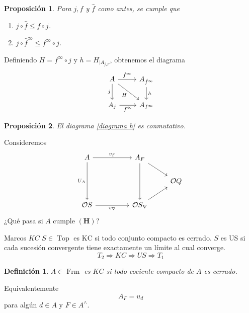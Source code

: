 \documentclass[compress,12pt]{beamer}
\DeclareMathOperator{\Frm}{Frm}
\DeclareMathOperator{\Top}{Top}
\newtheorem{dfn}{Definición}
\newtheorem{prop}{Proposición}
\begin{document}
\begin{frame}[fragile]
\begin{prop}
Para $j, f$ y $\hat{f}$ como antes, se cumple que
\begin{enumerate}
\item $j\circ \hat{f}\leq f\circ j$.
\item $j\circ \hat{f}^\infty \leq f^\infty\circ j$.
\end{enumerate}
\end{prop}

Definiendo $H=f^\infty\circ j$ y $h=H_{\mid A_{j_*F}}$, obtenemos el diagrama
\begin{equation}\label{diagrama h}
	\begin{tikzcd}
	A & {A_{\hat{f}^\infty}} \\
	{A_j} & {A_{f^\infty}}
	\arrow["{\hat{f}^\infty}", from=1-1, to=1-2]
	\arrow["j"', from=1-1, to=2-1]
	\arrow["H"', from=1-1, to=2-2]
	\arrow["h", from=1-2, to=2-2]
	\arrow["{f^\infty}"', from=2-1, to=2-2]
\end{tikzcd}
\end{equation}

\begin{prop}
	El diagrama \eqref{diagrama h} es conmutativo.
\end{prop}
\end{frame}

\begin{frame}[fragile]
Consideremos 
\[\begin{tikzcd}
	A && {A_F} \\
	&&& {\mathcal{O}Q} \\
	{\mathcal{O}S} && {\mathcal{O}S_\nabla}
	\arrow["{v_F}", from=1-1, to=1-3]
	\arrow["{U_A}"', from=1-1, to=3-1]
	\arrow[from=1-3, to=2-4]
	\arrow[from=1-3, to=3-3]
	\arrow["{v_\nabla}"', from=3-1, to=3-3]
	\arrow[from=3-3, to=2-4]
\end{tikzcd}\]
¿Qué pasa si $A$ cumple $\mathbf{(H)}$?
\end{frame}

\begin{frame}{Marcos $KC$}
$S\in \Top$ es $\mathrm{KC}$ si todo conjunto compacto es cerrado. $S$ es $\mathrm{US}$ si cada sucesión convergente tiene exactamente un límite al cual converge.
\[
T_2\Rightarrow KC\Rightarrow US\Rightarrow T_1
\]

\begin{dfn}
$A\in \Frm$ es $KC$ si todo cociente compacto de $A$ es cerrado. 
\end{dfn}
Equivalentemente
\[
A_F=u_d
\]
para algún $d\in A$ y $F\in A^\wedge$.
\end{frame}
\end{document}

